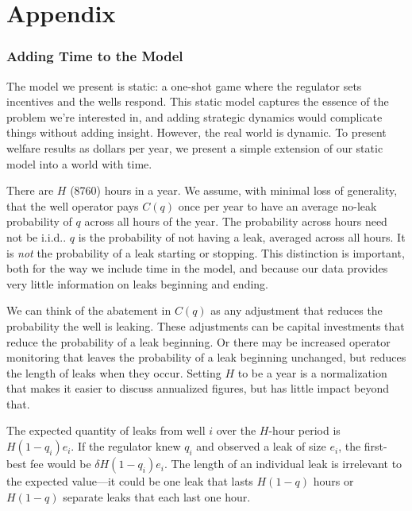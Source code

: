 \documentclass[12pt,oneside,letterpaper]{article}
\theoremstyle{definition}
\begin{document}
\begin{refsection}


\clearpage
\twocolumn
{\singlespacing
\printbibliography
}
\end{refsection}
\onecolumn
\newpage

\appendix
\part{Appendix}

\begin{refsection}
\section{Adding Time to the Model}
\label{sec:adding-time-to-the-model}

The model we present is static: a one-shot game where the regulator sets incentives and the wells respond.
This static model captures the essence of the problem we're interested in, and adding strategic dynamics would complicate things without adding insight.
However, the real world is dynamic.
To present welfare results as dollars per year, we present a simple extension of our static model into a world with time.

There are \(H\) (8760) hours in a year.
We assume, with minimal loss of generality, that the well operator pays \(C(q)\) once per year to have an average no-leak probability of \(q\) across all hours of the year.
The probability across hours need not be \gls{i.i.d.}.
\(q\) is the probability of not having a leak, averaged across all hours.
It is \emph{not} the probability of a leak starting or stopping.
This distinction is important, both for the way we include time in the model, and because our data provides very little information on leaks beginning and ending.

We can think of the abatement in \(C(q)\) as any adjustment that reduces the probability the well is leaking.
These adjustments can be capital investments that reduce the probability of a leak beginning.
Or there may be increased operator monitoring that leaves the probability of a leak beginning unchanged, but reduces the length of leaks when they occur.
Setting \(H\) to be a year is a normalization that makes it easier to discuss annualized figures, but has little impact beyond that.

The expected quantity of leaks from well \(i\) over the \(H\)-hour period is \(H (1-q_i) e_i\).
If the regulator knew \(q_i\) and observed a leak of size \(e_i\), the first-best fee would be \(\delta H (1-q_i) e_i\).
The length of an individual leak is irrelevant to the expected value---it could be one leak that lasts \(H (1 - q)\) hours or \(H (1 - q)\) separate leaks that each last one hour.



\end{refsection}
\end{document}
